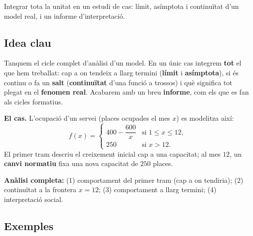 %
{Integrar tota la unitat en un estudi de cas: límit, asímptota i continuïtat d'un model real, i un informe d'interpretació.}

\subsection{Idea clau}

Tanquem el cicle complet d'anàlisi d'un model. En un únic cas integrem \textbf{tot} el
que hem treballat: cap a on tendeix a llarg termini (\textbf{límit} i
\textbf{asímptota}), si és continu o fa un \textbf{salt} (\textbf{continuïtat} d'una
funció a trossos) i què significa tot plegat en el \textbf{fenomen real}. Acabarem amb
un breu \textbf{informe}, com els que es fan als cicles formatius.

\begin{idea}
\textbf{El cas.} L'ocupació d'un servei (places ocupades el mes $x$) es modelitza així:
\[
f(x)=
\begin{cases}
400-\dfrac{600}{x} & \text{si } 1\le x\le 12,\\[8pt]
250 & \text{si } x>12.
\end{cases}
\]
El primer tram descriu el creixement inicial cap a una capacitat; al mes $12$, un
\textbf{canvi normatiu} fixa una nova capacitat de $250$ places.

\textbf{Anàlisi completa:} (1) comportament del primer tram (cap a on tendiria);
(2) continuïtat a la frontera $x=12$; (3) comportament a llarg termini; (4)
interpretació social.
\end{idea}

\subsection{Exemples}

